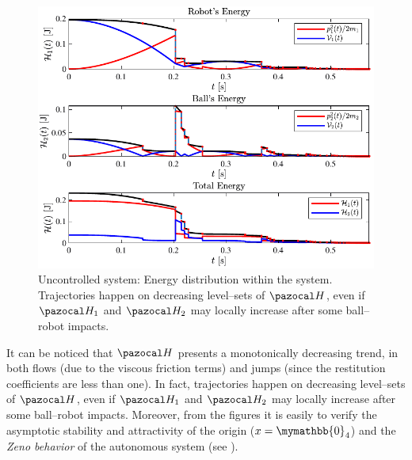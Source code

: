 %
\begin{figure}[!ht]
	\centering
	\includegraphics[width=\linewidth]{Figures/aut4.pdf}
	\caption[Uncontrolled system: Energy distribution within the system.]{Uncontrolled system: Energy distribution within the system. Trajectories happen on decreasing level--sets of $\Ha$, even if $\Ha_1$ and $\Ha_2$ may locally increase after some ball--robot impacts.}
	\label{fig:aut4}
\end{figure}
%
%
It can be noticed that $\Ha$ presents a monotonically decreasing trend, in both flows (due to the viscous friction terms) and jumps (since the restitution coefficients are less than one). In fact, trajectories happen on decreasing level--sets of $\Ha$, even if $\Ha_1$ and $\Ha_2$ may locally increase after some ball--robot impacts. Moreover, from the figures it is easily to verify the asymptotic stability and attractivity of the origin ($x = \mymathbb{0}_4$) and the \textit{Zeno behavior} of the autonomous system (see \cite{goebel2009hybrid}).
